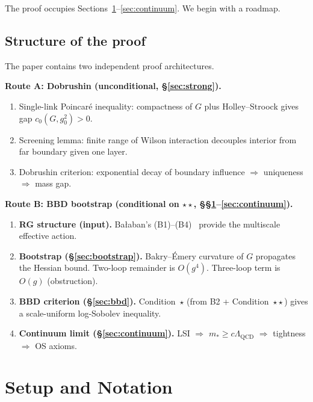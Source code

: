 \documentclass[11pt,a4paper]{article}
\theoremstyle{plain}
\theoremstyle{definition}
\theoremstyle{remark}
\begin{document}
The proof occupies
Sections~\ref{sec:setup}--\ref{sec:continuum}. We begin
with a roadmap.

\subsection{Structure of the proof}

The paper contains two independent proof architectures.

\textbf{Route A: Dobrushin (unconditional, \S\ref{sec:strong}).}
\begin{enumerate}[label=\textbf{A\arabic*:},leftmargin=3em]
  \item Single-link Poincar\'e inequality: compactness of $G$
    plus Holley--Stroock gives gap $c_0(G,g_0^2) > 0$.
  \item Screening lemma: finite range of Wilson interaction
    decouples interior from far boundary given one layer.
  \item Dobrushin criterion: exponential decay of boundary
    influence $\Rightarrow$ uniqueness $\Rightarrow$ mass gap.
\end{enumerate}

\textbf{Route B: BBD bootstrap (conditional on $\star\star$,
\S\S\ref{sec:setup}--\ref{sec:continuum}).}
\begin{enumerate}[label=\textbf{B\arabic*:},leftmargin=3em]
  \item \textbf{RG structure (input).}
    Ba\l{}aban's (B1)--(B4)~\cite{Bal87,Bal88a}
    provide the multiscale effective action.
  \item \textbf{Bootstrap (\S\ref{sec:bootstrap}).}
    Bakry--\'Emery curvature of $G$ propagates the
    Hessian bound. Two-loop remainder is $O(g^4)$.
    Three-loop term is $O(g)$ (obstruction).
  \item \textbf{BBD criterion (\S\ref{sec:bbd}).}
    Condition~$\star$ (from B2 + Condition~$\star\star$)
    gives a scale-uniform log-Sobolev inequality.
  \item \textbf{Continuum limit (\S\ref{sec:continuum}).}
    LSI $\Rightarrow$ $m_* \ge c\Lambda_{\mathrm{QCD}}$
    $\Rightarrow$ tightness $\Rightarrow$ OS axioms.
\end{enumerate}

\section{Setup and Notation}\label{sec:setup}
\end{document}

